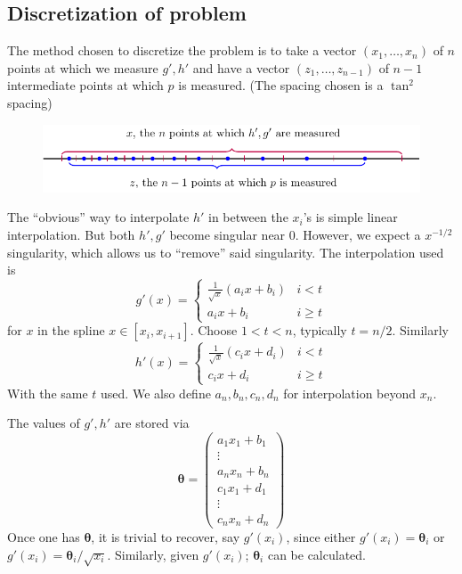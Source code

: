 \documentclass{article}
\newcommand{\bs}{\boldsymbol}                               %
\begin{document}
\subsection*{Discretization of problem}
The method chosen to discretize the problem is to take a vector 
$(x_1, \dots , x_n)$ of $n$ points at which we measure $g', h'$ and have a 
vector $(z_1, \dots ,z_{n-1})$ of $n-1$ intermediate 
points at which $p$ is measured. (The spacing chosen is a $\tan^2$ spacing)
\begin{figure}[!ht]\centering
\includegraphics{NumFig2.pdf}
\end{figure}

The ``obvious'' way to interpolate $h'$ in between the $x_i$'s is 
simple linear interpolation. But both $h',g'$ become singular near 0.
However, we expect a $x^{-1/2}$ singularity, which allows us to ``remove''
said singularity. 
The interpolation used is
\[ g'(x) = \left\{ \begin{array}{cc} \frac{1}{\sqrt{x}}(a_ix+b_i) &
i <t \\ a_ix+b_i & i \geq t \end{array} \right. \]
for $x$ in the spline $x \in [x_i,x_{i+1}]$. Choose $1 < t < n$, typically
$t=n/2$. Similarly
\[ h'(x) = \left\{ \begin{array}{cc} \frac{1}{\sqrt{x}}(c_ix+d_i) &
i <t \\ c_ix+d_i & i \geq t \end{array} \right. \]
With the same $t$ used. We also define $a_n, b_n, c_n, d_n$ for interpolation
beyond $x_n$.

The values of $g',h'$ are stored via 
\[ \bs{\theta} = \left( \begin{array}{c} a_1x_1+b_1 \\ \vdots 
\\ a_n x_n+b_n \\[4pt] c_1x_1+d_1 \\ \vdots \\ c_n x_n + d_n \end{array} 
\right) \]
Once one has $\bs{\theta}$, it is trivial to recover, say $g'(x_i)$, since
either $g'(x_i) = \bs{\theta}_i$ or $g'(x_i) = \bs{\theta}_i/\sqrt{x_i}$.
Similarly, given $g'(x_i)$; $\bs{\theta}_i$ can be calculated.
\end{document}

